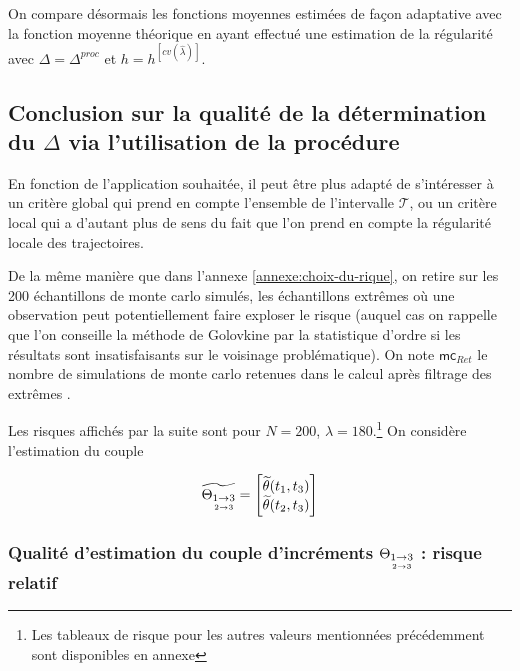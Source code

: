 On compare désormais les fonctions moyennes estimées de façon adaptative avec la fonction moyenne théorique en ayant effectué une estimation de la régularité avec $\Delta = \Delta^{proc}$ et $h = h^{[cv(\widehat \lambda)]}$.


\subsection{Conclusion sur la qualité de la détermination du $\Delta$ via l'utilisation de la procédure}

En fonction de l'application souhaitée, il peut être plus adapté de s'intéresser à un critère global qui prend en compte l'ensemble de l'intervalle $\mathcal T$, ou un critère local qui a d'autant plus de sens du fait que l'on prend en compte la régularité locale des trajectoires.

\bigskip

\noindent De la même manière que dans l'annexe \ref{annexe:choix-du-rique}, on retire sur les 200 échantillons de monte carlo simulés, les échantillons \og extrêmes \fg où une observation peut potentiellement faire exploser le risque (auquel cas on rappelle que l'on conseille la méthode de Golovkine par la statistique d'ordre si les résultats sont insatisfaisants sur le voisinage problématique). On note $\textsf{mc}_{Ret}$ le nombre de simulations de monte carlo retenues dans le calcul après filtrage des \og extrêmes \fg.

\bigskip

\noindent Les risques affichés par la suite sont pour $N=200$, $\lambda = 180$.\footnote{Les tableaux de risque pour les autres valeurs mentionnées précédemment sont disponibles en annexe} On considère l'estimation du couple 

\begin{equation*}
\widetilde {\Theta_{\underset{2 \rightarrow 3}{1 \rightarrow 3}}} = \begin{bmatrix} \widetilde \theta(t_1, t_3)\\ \widetilde \theta(t_2, t_3) \end{bmatrix}
\end{equation*}

\bigskip

\subsubsection{Qualité d'estimation du couple d'incréments $\Theta_{\underset{2 \rightarrow 3}{1 \rightarrow 3}}$ : risque relatif}

